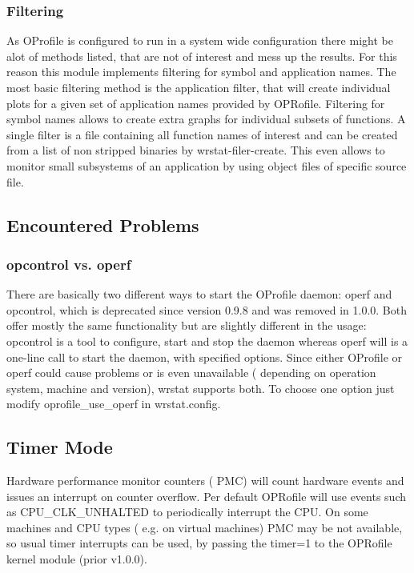     \subsubsection{Filtering}
    As OProfile is configured to run in a system wide configuration there might be alot
    of methods listed, that are not of interest and mess up the results.
    For this reason this module implements filtering for symbol and application names.
    The most basic filtering method is the application filter,
    that will create individual plots for a given set of application names provided by OPRofile.
    Filtering for symbol names allows to create extra graphs for individual subsets of functions.
    A single filter is a file containing all function names of interest
    and can be created from a list of non stripped binaries by wrstat-filer-create.
    This even allows to monitor small subsystems of an application by using 
    object files of specific source file.

\subsection{Encountered Problems}
    \subsubsection{opcontrol vs. operf}
    There are basically two different ways to start the OProfile daemon: operf and opcontrol,
    which is deprecated since version 0.9.8 and was removed in 1.0.0.
    Both offer mostly the same functionality but are slightly different in the usage:
    opcontrol is a tool to configure, start and stop the daemon
    whereas operf will is a one-line call to start the daemon, with specified options.
    Since either OProfile or operf could cause problems or is even unavailable
    ( depending on operation system, machine and version), wrstat supports both.
    To choose one option just modify oprofile\_use\_operf in wrstat.config.

    \subsection{Timer Mode}
    Hardware performance monitor counters ( PMC) will count hardware events
    and issues an interrupt on counter overflow.
    Per default OPRofile will use events such as CPU\_CLK\_UNHALTED to periodically
    interrupt the CPU.
    On some machines and CPU types ( e.g. on virtual machines) PMC may be not available,
    so usual timer interrupts can be used, by passing the timer=1 to the OPRofile kernel module (prior v1.0.0).

